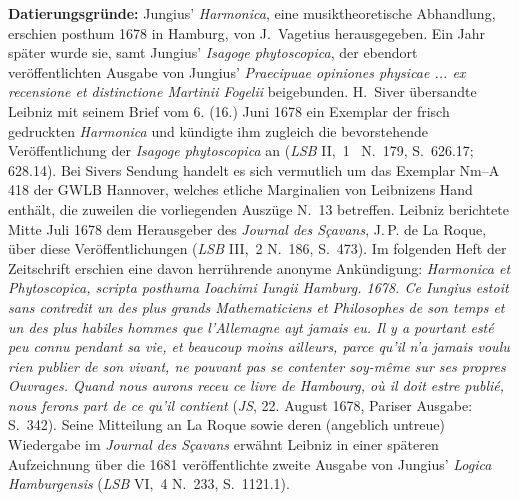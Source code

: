 \begin{ledgroup}
\footnotesize
\pstart
\noindent\footnotesize%
\textbf{Datierungsgründe:}
Jungius'\protect{} \cite{01266}\textit{Harmonica}, eine musiktheoretische Abhandlung, erschien posthum 1678 in Hamburg\protect{}, von J.~Vagetius\protect{} herausgegeben.
Ein Jahr später wurde sie,
samt Jungius' \cite{01268}\textit{Isagoge phytoscopica},
der ebendort veröffentlichten Ausgabe von Jungius' \cite{01267}\textit{Praecipuae opiniones physicae ... ex recensione et distinctione Martinii Fogelii}\protect{} beigebunden.
H.~Siver\protect{} übersandte Leibniz mit seinem Brief vom 6. (16.) Juni 1678 ein Exemplar der frisch gedruckten \textit{Harmonica} und kündigte ihm zugleich die bevorstehende Veröffentlichung der \textit{Isagoge phytoscopica} an (\cite{01269}\textit{LSB} II,~1 \rbrack\ N.~179,
 S.~626.17; 628.14).
Bei Sivers Sendung handelt es sich vermutlich um das Exemplar Nm–A 418 der GWLB Hannover, welches etliche Marginalien von Leibnizens Hand enthält, die zuweilen die vorliegenden Auszüge N.~13 betreffen.
\pend
\pstart
Leibniz berichtete Mitte Juli 1678 dem Herausgeber des \textit{Journal des Sçavans}, J.\,P. de La Roque,\protect{} über diese Veröffentlichungen (\cite{01270}\textit{LSB} III,~2 N.~186, S.~473).
Im folgenden Heft der Zeitschrift erschien eine davon herrührende anonyme Ankündigung:
\textit{Harmonica et Phytoscopica, scripta posthuma Ioachimi Iungii Hamburg. 1678. Ce Iungius estoit sans contredit un des plus grands Mathematiciens et Philosophes de son temps et un des plus habiles hommes que l’Allemagne ayt jamais eu. Il y a pourtant esté peu connu pendant sa vie, et beaucoup moins ailleurs, parce qu’il n’a jamais voulu rien publier de son vivant, ne pouvant pas se contenter soy-même sur ses propres Ouvrages. Quand nous aurons receu ce livre de Hambourg, où il doit estre publié, nous ferons part de ce qu’il contient} (\cite{01271}\textit{JS}, 22. August 1678, Pariser Ausgabe: S.~342). %
Seine Mitteilung an La Roque\protect{} sowie deren
(angeblich untreue) 
Wiedergabe im \textit{Journal des Sçavans} erwähnt Leibniz in einer späteren Aufzeichnung über die 1681 veröffentlichte zweite Ausgabe von Jungius' \textit{Logica Hamburgensis} (\cite{01272}\textit{LSB} VI,~4 N.~233, S.~1121.1).

\end{ledgroup}
